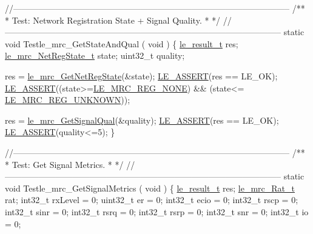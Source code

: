 \begin{DoxyCodeInclude}
\textcolor{comment}{//--------------------------------------------------------------------------------------------------}\textcolor{comment}{}
\textcolor{comment}{/**}
\textcolor{comment}{ * Test: Network Registration State + Signal Quality.}
\textcolor{comment}{ *}
\textcolor{comment}{ */}
\textcolor{comment}{//--------------------------------------------------------------------------------------------------}
\textcolor{keyword}{static} \textcolor{keywordtype}{void} Testle\_mrc\_GetStateAndQual
(
    \textcolor{keywordtype}{void}
)
\{
    \hyperlink{le__basics_8h_a1cca095ed6ebab24b57a636382a6c86c}{le\_result\_t}           res;
    \hyperlink{le__mrc__interface_8h_ae2877a1e1252ac79e6c9cae3d3c25a61}{le\_mrc\_NetRegState\_t}  state;
    uint32\_t              quality;

    res = \hyperlink{le__mrc__interface_8h_a4f11e27862fef384c0023f5b538e543d}{le\_mrc\_GetNetRegState}(&state);
    \hyperlink{le__log_8h_ac0dbbef91dc0fed449d0092ff0557b39}{LE\_ASSERT}(res == LE\_OK);
    \hyperlink{le__log_8h_ac0dbbef91dc0fed449d0092ff0557b39}{LE\_ASSERT}((state>=\hyperlink{le__mrc__interface_8h_ae2877a1e1252ac79e6c9cae3d3c25a61affdd881b043ba92f868ffef52b0b9124}{LE\_MRC\_REG\_NONE}) && (state<=
      \hyperlink{le__mrc__interface_8h_ae2877a1e1252ac79e6c9cae3d3c25a61acdba928b7dfb851adfa0211acccabb65}{LE\_MRC\_REG\_UNKNOWN}));

    res = \hyperlink{le__mrc__interface_8h_a717aa0f4e4dc9a83b6adc2f26f3f0258}{le\_mrc\_GetSignalQual}(&quality);
    \hyperlink{le__log_8h_ac0dbbef91dc0fed449d0092ff0557b39}{LE\_ASSERT}(res == LE\_OK);
    \hyperlink{le__log_8h_ac0dbbef91dc0fed449d0092ff0557b39}{LE\_ASSERT}(quality<=5);
\}


\textcolor{comment}{//--------------------------------------------------------------------------------------------------}\textcolor{comment}{}
\textcolor{comment}{/**}
\textcolor{comment}{ * Test: Get Signal Metrics.}
\textcolor{comment}{ *}
\textcolor{comment}{ */}
\textcolor{comment}{//--------------------------------------------------------------------------------------------------}
\textcolor{keyword}{static} \textcolor{keywordtype}{void} Testle\_mrc\_GetSignalMetrics
(
    \textcolor{keywordtype}{void}
)
\{
    \hyperlink{le__basics_8h_a1cca095ed6ebab24b57a636382a6c86c}{le\_result\_t}   res;
    \hyperlink{le__mrc__interface_8h_aaf23906c37ad59fb96a8a48f7fab5b43}{le\_mrc\_Rat\_t}  rat;
    int32\_t rxLevel = 0;
    uint32\_t er = 0;
    int32\_t ecio = 0;
    int32\_t rscp = 0;
    int32\_t sinr = 0;
    int32\_t rsrq = 0;
    int32\_t rsrp = 0;
    int32\_t snr = 0;
    int32\_t io = 0;


\end{DoxyCodeInclude}
